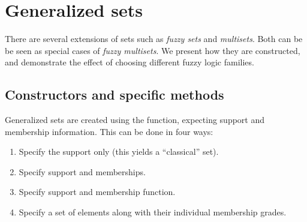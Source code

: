 \documentclass[article]{jss}
\newcommand{\codefun}[1]{\code{#1()}}
\newcommand{\dQuote}[1]{``{#1}''}
\begin{document}
\section{Generalized sets}
\label{sec:gsets}

There are several extensions of sets such as \emph{fuzzy sets}
and \emph{multisets}. Both can be be seen as special cases of
\emph{fuzzy multisets}. We present how they are constructed, and
demonstrate the effect of choosing different fuzzy logic families.

\subsection{Constructors and specific methods}

Generalized sets are created using the \codefun{gset} function,
expecting support and membership information. This
can be done in four ways:

\begin{enumerate}
\item Specify the support only (this yields a \dQuote{classical} set).
\item Specify support and memberships.
\item Specify support and membership function.
\item Specify a set of elements along with their individual membership grades.
\end{enumerate}
\end{document}
